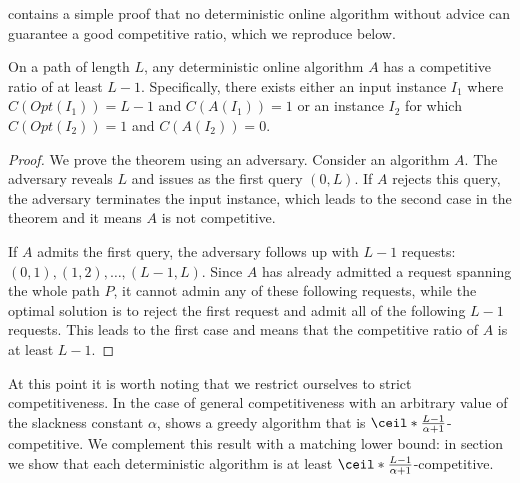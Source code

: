 
\cite{dpa-book} contains a simple proof that no deterministic online
algorithm without advice can guarantee a good competitive ratio, which we
reproduce below.

\begin{theorem}\label{theorem:dpa-deterministic}
    On a path of length $L$, any deterministic online algorithm $A$ has a
    competitive ratio of at least $L - 1$. Specifically, there exists
    either an input instance $I_1$ where $C(Opt(I_1)) = L - 1$ and
    $C(A(I_1)) = 1$ or an instance $I_2$ for which $C(Opt(I_2)) = 1$ and
    $C(A(I_2)) = 0$.
\end{theorem}

\begin{proof}
    We prove the theorem using an adversary. Consider an algorithm $A$.
    The adversary reveals $L$ and issues as the first query $(0, L)$. If
    $A$ rejects this query, the adversary terminates the input instance,
    which leads to the second case in the theorem and it means $A$ is not
    competitive.

    If $A$ admits the first query, the adversary follows up with $L - 1$
    requests: $(0, 1), (1, 2), \dots, (L - 1, L)$. Since $A$ has already
    admitted a request spanning the whole path $P$, it cannot admin any
    of these following requests, while the optimal solution is to reject
    the first request and admit all of the following $L - 1$ requests.
    This leads to the first case and means that the competitive ratio of
    $A$ is at least $L - 1$.
\end{proof}

At this point it is worth noting that we restrict ourselves to strict
competitiveness. In the case of general competitiveness with an arbitrary
value of the slackness constant $\alpha$, \cite{komm-thesis} shows a
greedy algorithm that is $\ceil*{\frac{L - 1}{\alpha + 1}}$-competitive.
We complement this result with a matching lower bound: in section
 we show that each deterministic algorithm is
at least $\ceil*{\frac{L - 1}{\alpha + 1}}$-competitive.


